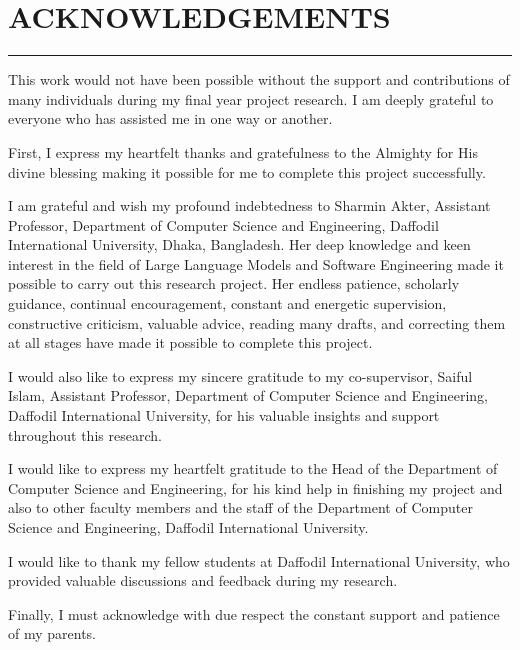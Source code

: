 \chapter*{ACKNOWLEDGEMENTS}
\thispagestyle{plain}
\noindent\rule{\linewidth}{0.5pt}

This work would not have been possible without the support and contributions of many individuals during my final year project research. I am deeply grateful to everyone who has assisted me in one way or another.

First, I express my heartfelt thanks and gratefulness to the Almighty for His divine blessing making it possible for me to complete this project successfully.

I am grateful and wish my profound indebtedness to Sharmin Akter, Assistant Professor, Department of Computer Science and Engineering, Daffodil International University, Dhaka, Bangladesh. Her deep knowledge and keen interest in the field of Large Language Models and Software Engineering made it possible to carry out this research project. Her endless patience, scholarly guidance, continual encouragement, constant and energetic supervision, constructive criticism, valuable advice, reading many drafts, and correcting them at all stages have made it possible to complete this project.

I would also like to express my sincere gratitude to my co-supervisor, Saiful Islam, Assistant Professor, Department of Computer Science and Engineering, Daffodil International University, for his valuable insights and support throughout this research.

I would like to express my heartfelt gratitude to the Head of the Department of Computer Science and Engineering, for his kind help in finishing my project and also to other faculty members and the staff of the Department of Computer Science and Engineering, Daffodil International University.

I would like to thank my fellow students at Daffodil International University, who provided valuable discussions and feedback during my research.

Finally, I must acknowledge with due respect the constant support and patience of my parents.

